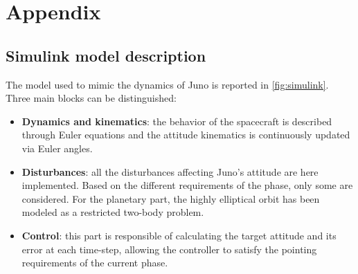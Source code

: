 \section{Appendix}
\label{sec:appendix_4}

\subsection{Simulink model description}
\label{subsec:simulink}


The model used to mimic the dynamics of Juno is reported in \autoref{fig:simulink}. Three main blocks can be distinguished:

\begin{itemize}
    \item \textbf{Dynamics and kinematics}: the behavior of the spacecraft is described through Euler equations and the attitude kinematics is continuously updated via Euler angles. 
    \item \textbf{Disturbances}: all the disturbances affecting Juno's attitude are here implemented. Based on the different requirements of the phase, only some are considered. For the planetary part, the highly elliptical orbit has been modeled as a restricted two-body problem. 
    \item \textbf{Control}: this part is responsible of calculating the target attitude and its error at each time-step, allowing the controller to satisfy the pointing requirements of the current phase.
\end{itemize}